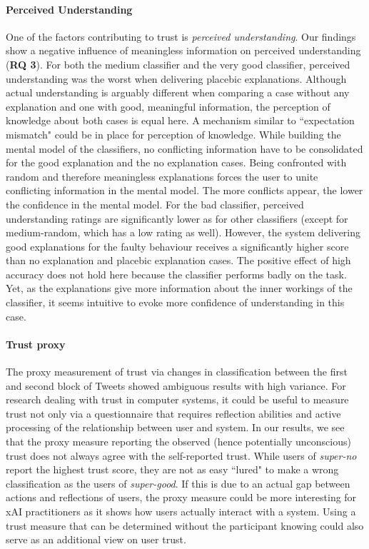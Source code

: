 \paragraph{Perceived Understanding} 
One of the factors contributing to trust is \textit{perceived understanding}. Our findings show a negative influence of meaningless information on perceived understanding (\textbf{RQ 3}). For both the medium classifier and the very good classifier, perceived understanding was the worst when delivering placebic explanations. Although actual understanding is arguably different when comparing a case without any explanation and one with good, meaningful information, the perception of knowledge about both cases is equal here. A mechanism similar to ``expectation mismatch" could be in place for perception of knowledge. While building the mental model of the classifiers, no conflicting information have to be consolidated for the good explanation and the no explanation cases. Being confronted with random and therefore meaningless explanations forces the user to unite conflicting information in the mental model. The more conflicts appear, the lower the confidence in the mental model.\newline
For the bad classifier, perceived understanding ratings are significantly lower as for other classifiers (except for medium-random, which has a low rating as well). However, the system delivering good explanations for the faulty behaviour receives a significantly higher score than no explanation and placebic explanation cases. The positive effect of high accuracy does not hold here because the classifier performs badly on the task. Yet, as the explanations give more information about the inner workings of the classifier, it seems intuitive to evoke more confidence of understanding in this case.\newline
\paragraph{Trust proxy}
The proxy measurement of trust via changes in classification between the first and second block of Tweets showed ambiguous results with high variance. For research dealing with trust in computer systems, it could be useful to measure trust not only via a questionnaire that requires reflection abilities and active processing of the relationship between user and system. In our results, we see that the proxy measure reporting the observed (hence potentially unconscious) trust does not always agree with the self-reported trust. While users of \textit{super-no} report the highest trust score, they are not as easy ``lured" to make a wrong classification as the users of \textit{super-good}. If this is due to an actual gap between actions and reflections of users, the proxy measure could be more interesting for xAI practitioners as it shows how users actually interact with a system. Using a trust measure that can be determined without the participant knowing could also serve as an additional view on user trust.\medskip \newline

